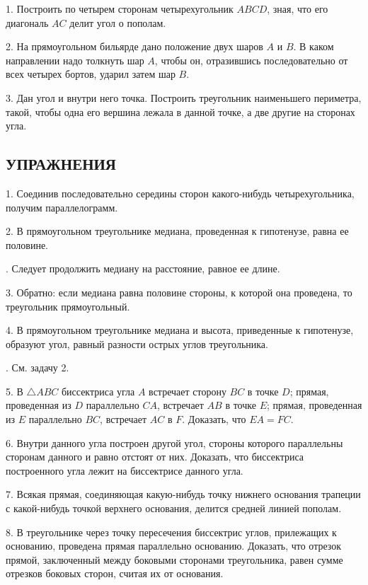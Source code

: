 \documentclass[oneside]{book}
\begin{document}
\medskip

1.
Построить по четырем сторонам четырехугольник $ABCD$, зная, что его диагональ $AC$ делит угол о пополам.

2.
На прямоугольном бильярде дано положение двух шаров $A$ и $B$.
В каком направлении надо толкнуть шар $A$, чтобы он, отразившись последовательно от всех четырех бортов, ударил затем шар $B$.

3.
Дан угол и внутри него точка.
Построить треугольник наименьшего периметра, такой, чтобы одна его вершина лежала в данной точке, а две другие на сторонах угла.

\subsection*{УПРАЖНЕНИЯ}



1.
Соединив последовательно середины сторон какого-нибудь четырехугольника, получим параллелограмм.

2.
В прямоугольном треугольнике медиана, проведенная к гипотенузе, равна ее половине.

.
Следует продолжить медиану на расстояние, равное ее длине.

3.
Обратно:
если медиана равна половине стороны, к которой она проведена, то треугольник прямоугольный.

4.
В прямоугольном треугольнике медиана и высота, приведенные к гипотенузе, образуют угол, равный разности острых углов треугольника.

.
См.
задачу 2.

5.
В $\triangle ABC$ биссектриса угла $A$ встречает сторону $BC$ в точке $D$;
прямая, проведенная из $D$ параллельно $CA$, встречает $AB$ в точке $E$;
прямая, проведенная из $E$ параллельно $BC$, встречает $AC$ в $F$.
Доказать, что $EA=FC$.

6.
Внутри данного угла построен другой угол, стороны которого параллельны сторонам данного и равно отстоят от них.
Доказать, что биссектриса построенного угла лежит на биссектрисе данного угла.

7.
Всякая прямая, соединяющая какую-нибудь точку нижнего основания трапеции с какой-нибудь точкой верхнего основания, делится средней линией пополам.

8.
В треугольнике через точку пересечения биссектрис углов, прилежащих к основанию, проведена прямая параллельно основанию.
Доказать, что отрезок прямой, заключенный между боковыми сторонами треугольника, равен сумме отрезков боковых сторон, считая их от основания.
\end{document}
